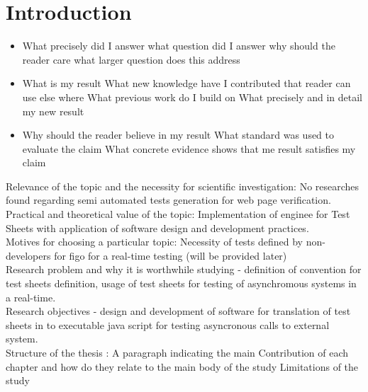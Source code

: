 \chapter{Introduction}

\begin{itemize}
\item What precisely did I answer
	\subitem what question did I answer
	\subitem why should the reader care
	\subitem what larger question does this address
\item What is my result
	\subitem What new knowledge have I contributed that reader can use else where
	\subitem What previous work do I build on
	\subitem What precisely and in detail my new result
\item Why should the reader believe in my result
	\subitem What standard was used to evaluate the claim
	\subitem What concrete evidence shows that me result satisfies my claim
\end{itemize}


Relevance of the topic and the necessity for scientific investigation: No researches found regarding semi automated tests generation for web page verification.\\
Practical and theoretical value of the topic: Implementation of enginee for Test Sheets with application of software design and development practices.\\
Motives for choosing a particular topic:  Necessity of tests defined by non-developers for figo for a real-time testing (will be provided later)\\
Research problem and why it is worthwhile studying - definition of convention for test sheets definition, usage of test sheets for testing of asynchromous systems in a real-time.\\
Research objectives - design and development of software for translation of test sheets in to executable java script for testing asyncronous calls to external system.\\


Structure of the thesis : A paragraph indicating the main
 Contribution of each chapter and how do they relate
to the main body of the study
Limitations of the study\\




